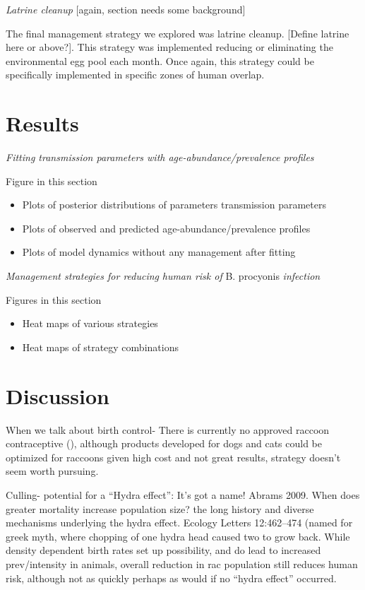 \documentclass[11pt]{article}
\begin{document}
\emph{Latrine cleanup} {[}again, section needs some background{]}

The final management strategy we explored was latrine cleanup. {[}Define
latrine here or above?{]}. This strategy was implemented reducing or
eliminating the environmental egg pool each month. Once again, this
strategy could be specifically implemented in specific zones of human
overlap.

\section{Results}

\emph{Fitting transmission parameters with age-abundance/prevalence
profiles}

Figure in this section

\begin{itemize}
\item
  Plots of posterior distributions of parameters transmission parameters
\item
  Plots of observed and predicted age-abundance/prevalence profiles
\item
  Plots of model dynamics without any management after fitting
\end{itemize}

\emph{Management strategies for reducing} \emph{human risk of} B.
procyonis \emph{infection}

Figures in this section

\begin{itemize}
\item
  Heat maps of various strategies
\item
  Heat maps of strategy combinations
\end{itemize}

\section{Discussion}

When we talk about birth control- There is currently no approved raccoon
contraceptive (), although products developed for dogs and cats could be
optimized for raccoons given high cost and not great results, strategy
doesn't seem worth pursuing.

Culling- potential for a ``Hydra effect'': It's got a name! Abrams 2009.
When does greater mortality increase population size? the long history
and diverse mechanisms underlying the hydra effect. Ecology Letters
12:462--474 (named for greek myth, where chopping of one hydra head
caused two to grow back. While density dependent birth rates set up
possibility, and do lead to increased prev/intensity in animals, overall
reduction in rac population still reduces human risk, although not as
quickly perhaps as would if no ``hydra effect'' occurred.
\end{document}
